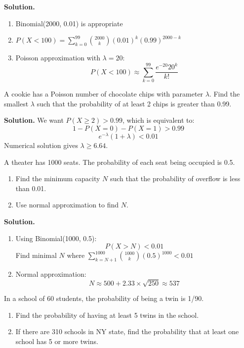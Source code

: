 \noindent\textbf{Solution.}
\begin{enumerate}[label=(\alph*)]
\item Binomial(2000, 0.01) is appropriate
\item \( P(X < 100) = \sum_{k=0}^{99} \binom{2000}{k} (0.01)^k (0.99)^{2000-k} \)
\item Poisson approximation with \( \lambda = 20 \):
\[ P(X < 100) \approx \sum_{k=0}^{99} \frac{e^{-20} 20^k}{k!} \]
\end{enumerate}

\begin{problembox}
A cookie has a Poisson number of chocolate chips with parameter \( \lambda \). Find the smallest \( \lambda \) such that the probability of at least 2 chips is greater than 0.99.
\end{problembox}

\noindent\textbf{Solution.}
We want \( P(X \geq 2) > 0.99 \), which is equivalent to:
\[ 1 - P(X=0) - P(X=1) > 0.99 \]
\[ e^{-\lambda}(1 + \lambda) < 0.01 \]
Numerical solution gives \( \lambda \geq 6.64 \).

\begin{problembox}
A theater has 1000 seats. The probability of each seat being occupied is 0.5.
\begin{enumerate}[label=(\alph*)]
\item Find the minimum capacity \( N \) such that the probability of overflow is less than 0.01.
\item Use normal approximation to find \( N \).
\end{enumerate}
\end{problembox}

\noindent\textbf{Solution.}
\begin{enumerate}[label=(\alph*)]
\item Using Binomial(1000, 0.5):
\[ P(X > N) < 0.01 \]
Find minimal \( N \) where \( \sum_{k=N+1}^{1000} \binom{1000}{k} (0.5)^{1000} < 0.01 \)

\item Normal approximation:
\[ N \approx 500 + 2.33 \times \sqrt{250} \approx 537 \]
\end{enumerate}

\begin{problembox}
In a school of 60 students, the probability of being a twin is 1/90.
\begin{enumerate}[label=(\alph*)]
\item Find the probability of having at least 5 twins in the school.
\item If there are 310 schools in NY state, find the probability that at least one school has 5 or more twins.
\end{enumerate}
\end{problembox}

